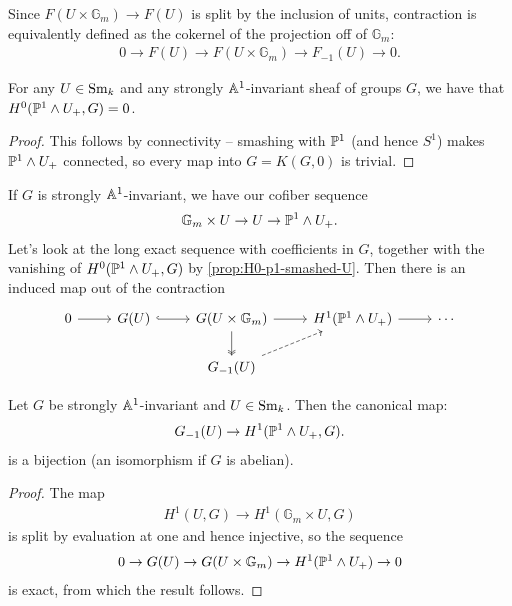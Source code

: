 \documentclass[11pt,openany]{book}
\let\smashprod\wedge
\begin{document}
\begin{remark} Since $F(U \times \mathbb{G}_m) \to F(U)$ is split by the inclusion of units, contraction is equivalently defined as the cokernel of the projection off of $\mathbb{G}_m$:
\begin{align*}
    0 \to F(U) \to F(U \times \mathbb{G}_m) \to F_{-1}(U) \to 0.
\end{align*}
\end{remark}

\begin{proposition}\label{prop:H0-p1-smashed-U} 
For any $U \in \Sm_k$ and any strongly $\A^1$-invariant sheaf of groups $G$, we have that $H^0(\P^1\smashprod U_+,G) = 0$.
\end{proposition}
\begin{proof} This follows by connectivity -- smashing with $\P^1$ (and hence $S^1$) makes $\P^1 \smashprod U_+$ connected, so every map into $G=K(G,0)$ is trivial.
\end{proof}

\begin{remark} If $G$ is strongly $\A^1$-invariant, we have our cofiber sequence
\begin{align*}
    \mathbb{G}_m \times U \to  U \to \P^1 \smashprod U_+.
\end{align*}
Let's look at the long exact sequence with coefficients in $G$, together with the vanishing of $H^0(\P^1 \smashprod U_+,G)$ by \autoref{prop:H0-p1-smashed-U}. Then there is an induced map out of the contraction
\[ \begin{tikzcd}
    0\rar & G(U) \rar[hook] & G(U \times \mathbb{G}_m)\rar\dar[two heads] & H^1(\P^1 \smashprod U_+)\rar & \cdots \\
     &  & G_{-1}(U)\ar[ur,dashed]
\end{tikzcd} \]
\end{remark}


\begin{lemma} \cite[2.34]{Morel} Let $G$ be strongly $\A^1$-invariant and $U \in \Sm_k$. Then the canonical map:
\begin{align*}
    G_{-1}(U) \to H^1(\P^1 \smashprod  U_+, G).
\end{align*}
is a bijection (an isomorphism if $G$ is abelian).
\end{lemma}
\begin{proof} The map
\begin{align*}
    H^1(U,G)  \to H^1(\mathbb{G}_m \times U,G)
\end{align*}
is split by evaluation at one and hence injective, so the sequence
\begin{align*}
    0 \to G(U) \to G(U \times \mathbb{G}_m) \to H^1(\P^1 \smashprod U_+) \to 0
\end{align*}
is exact, from which the result follows.
\end{proof}
\end{document}
